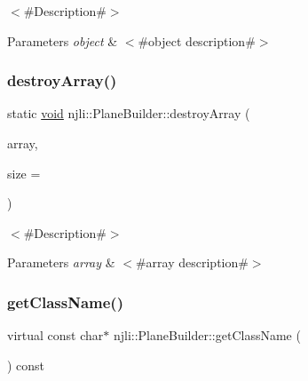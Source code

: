 $<$\#\+Description\#$>$


\begin{DoxyParams}{Parameters}
{\em object} & $<$\#object description\#$>$ \\
\hline
\end{DoxyParams}
\mbox{\label{classnjli_1_1_plane_builder_a17452a7478fdf3290fb050f1cf94b5fe}} 
\subsubsection{\texorpdfstring{destroy\+Array()}{destroyArray()}}
{\footnotesize\ttfamily static \mbox{\hyperlink{_thread_8h_af1e856da2e658414cb2456cb6f7ebc66}{void}} njli\+::\+Plane\+Builder\+::destroy\+Array (\begin{DoxyParamCaption}\item[{\mbox{\hyperlink{classnjli_1_1_plane_builder}{Plane\+Builder}} $\ast$$\ast$}]{array,  }\item[{const \mbox{\hyperlink{_util_8h_a10e94b422ef0c20dcdec20d31a1f5049}{u32}}}]{size = {} }\end{DoxyParamCaption})\hspace{0.3cm}{\ttfamily [static]}}

$<$\#\+Description\#$>$


\begin{DoxyParams}{Parameters}
{\em array} & $<$\#array description\#$>$ \\
\hline
\end{DoxyParams}
\mbox{\label{classnjli_1_1_plane_builder_a54fa171ecbf4e38cc79d54ad5f9e6d92}} 
\subsubsection{\texorpdfstring{get\+Class\+Name()}{getClassName()}}
{\footnotesize\ttfamily virtual const char$\ast$ njli\+::\+Plane\+Builder\+::get\+Class\+Name (\begin{DoxyParamCaption}{ }\end{DoxyParamCaption}) const\hspace{0.3cm}{\ttfamily [virtual]}}

